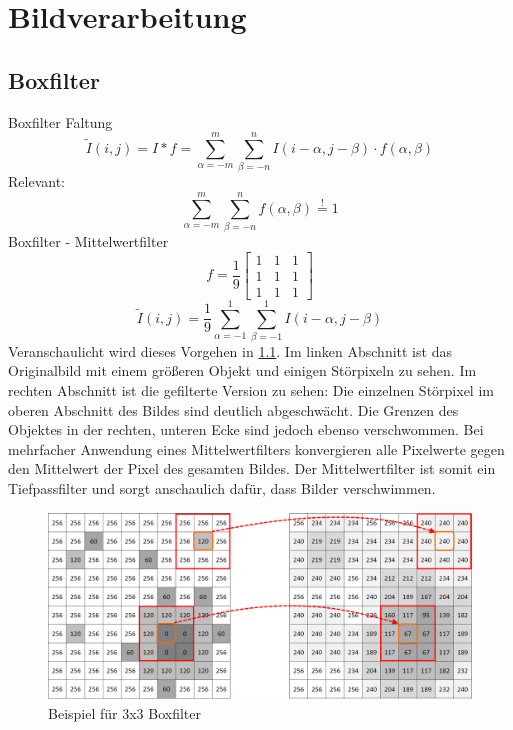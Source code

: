 \chapter{Bildverarbeitung}
\section{Boxfilter}
Boxfilter
Faltung
$$ \widetilde{I}(i, j)=I \ast f =  \sum_{\alpha=-m}^m \sum_{\beta=-n}^n I(i-\alpha, j-\beta) \cdot f(\alpha, \beta)$$
Relevant: 
$$ \sum_{\alpha=-m}^m \sum_{\beta=-n}^n f(\alpha, \beta) \stackrel{!}{=} 1 $$
Boxfilter - Mittelwertfilter
$$ f=\frac{1}{9} \begin{bmatrix} 1&1&1 \\ 1&1&1 \\ 1&1&1 \end{bmatrix}$$
$$ \widetilde{I}(i, j)=\frac{1}{9} \sum_{\alpha=-1}^1 \sum_{\beta=-1}^1 I(i-\alpha, j-\beta) $$
Veranschaulicht wird dieses Vorgehen in \ref{fig:boxfilter}. Im linken Abschnitt ist das Originalbild mit einem gr\"o\ss{}eren Objekt und einigen St\"orpixeln zu sehen. Im rechten Abschnitt ist die gefilterte Version zu sehen: Die einzelnen St\"orpixel im oberen Abschnitt des Bildes sind deutlich abgeschw\"acht. Die Grenzen des Objektes in der rechten, unteren Ecke sind jedoch ebenso verschwommen. Bei mehrfacher Anwendung eines Mittelwertfilters konvergieren alle Pixelwerte gegen den Mittelwert der Pixel des gesamten Bildes. Der Mittelwertfilter ist somit ein Tiefpassfilter und sorgt anschaulich daf\"ur, dass Bilder verschwimmen.
\begin{figure}
 \centering
 \includegraphics[width=1\textwidth]{media/filter/boxfilter_combined.png}
 \caption{Beispiel für 3x3 Boxfilter}
 \label{fig:boxfilter}
\end{figure}

